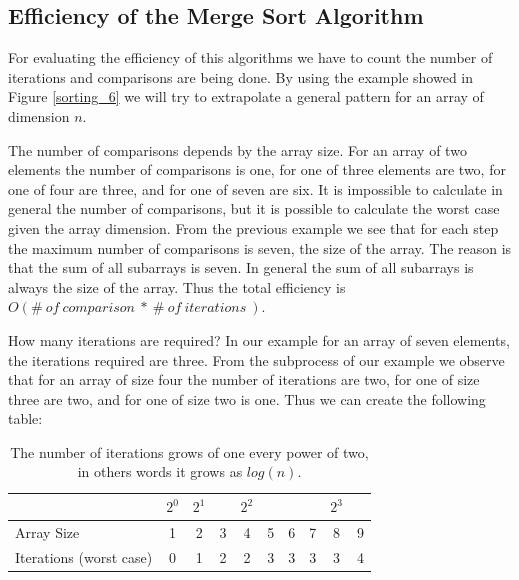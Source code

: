 \subsection{Efficiency of the Merge Sort Algorithm}
For evaluating the efficiency of this algorithms we have to count the number of iterations and comparisons are being done. By using the example showed in Figure \ref{sorting_6} we will try to extrapolate a general pattern for an array of dimension \(n\).

The number of comparisons depends by the array size. For an array of two elements the number of comparisons is one, for one of three elements are two, for one of four are three, and for one of seven are six. It is impossible to calculate in general the number of comparisons, but it is possible to calculate the worst case given the array dimension. From the previous example we see that for each step the maximum number of comparisons is seven, the size of the array. The reason is that the sum of all subarrays is seven. In general the sum of all subarrays is always the size of the array. Thus the total efficiency is \(O(\# \ of\ comparison \ * \ \# \ of \ iterations \ )\).

How many iterations are required? In our example for an array of seven elements, the iterations required are three. From the subprocess of our example we observe that for an array of size four the number of iterations are two, for one of size three are two, and for one of size two is one. Thus we can create the following table:

\begin{table}[H]
\caption[Merge Sort Efficiency]{The number of iterations grows of one every power of two, in others words it grows as \(log(n)\).}
\label{mergesortefficiency}
\centering
\begin{tabular}{ | l | c | c | c | c | c | c | c | c | c |}
   
    \multicolumn{1}{l}{} & \multicolumn{1}{c}{\(2^{0}\)} & 
    \multicolumn{1}{c}{\(2^{1}\)} & \multicolumn{1}{c}{} &
    \multicolumn{1}{c}{\(2^{2}\)} & \multicolumn{1}{c}{} & 
    \multicolumn{1}{c}{} & \multicolumn{1}{c}{}          & 
    \multicolumn{1}{c}{\(2^{3}\)} & \multicolumn{1}{c}{} \\
    \hline
	Array Size & \cellcolor{LightCyan} 1 & \cellcolor{LightCyan} 2 & 3 & \cellcolor{LightCyan} 4 & 5  & 6 & 7 & \cellcolor{LightCyan} 8 & 9 \\
    \hline
	Iterations (worst case) & \cellcolor{LightCyan} 0 & \cellcolor{LightCyan} 1 & 2 & \cellcolor{LightCyan} 2 & 3 & 3 & 3 & \cellcolor{LightCyan} 3 & 4 \\
	\hline	
\end{tabular}
\end{table}

